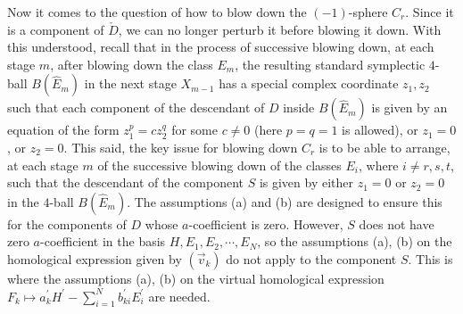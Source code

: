\documentclass[11pt]{amsart}
\theoremstyle{plain}
\numberwithin{theorem}{section}
\theoremstyle{definition}
\begin{document}
 Now it comes to the question of how to blow down the $(-1)$-sphere $C_r$. Since it is a component 
 of $\check{D}$, we can no longer perturb it before blowing it down. With this understood, recall that
 in the process of successive blowing down, at each stage $m$, after blowing down the class $E_m$,
 the resulting standard symplectic $4$-ball $B(\hat{E}_m)$ in the next stage $X_{m-1}$ has a special
 complex coordinate $z_1,z_2$ such that each component of the descendant of $D$ inside 
$B(\hat{E}_m)$ is given by an equation of the form $z_1^p=cz_2^q$ for some $c\neq 0$ (here $p=q=1$ is allowed), or $z_1=0$, or $z_2=0$. This said, the key issue for blowing down $C_r$ is to be able to arrange, at each stage $m$ of the successive blowing down of the classes $E_i$, where $i\neq r,s,t$, such that the descendant of the component $S$ is given by either $z_1=0$ or $z_2=0$ in the $4$-ball $B(\hat{E}_m)$. The assumptions (a) and (b) are designed to ensure this for the components of $D$ whose $a$-coefficient is zero. However, $S$ does not have zero $a$-coefficient in the basis $H,E_1,E_2,\cdots, E_N$, 
so the assumptions (a), (b) on the homological expression given by $(\vec{v}_k)$ do not apply to the component $S$. This is where the assumptions (a), (b) on the virtual homological expression 
$F_k\mapsto a_k^\prime H^\prime-\sum_{i=1}^N b_{ki}^\prime E_i^\prime$ are needed. 
\end{document}
